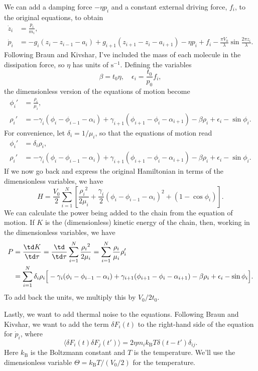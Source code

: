 \documentclass[11pt]{article}
\begin{document}
We can add a damping force $-\eta p_i$ and a constant external driving force, $f_i$, to the original equations, to obtain
\begin{align*}
\dot{z}_i&=\frac{p_i}{m_i},\\
\dot{p}_i&=-g_i(z_i-z_{i-1}-a_i)
	+g_{i+1}(z_{i+1}-z_i-a_{i+1})
	-\eta p_i+f_i
	-\frac{\pi V_0}{\lambda}\sin\frac{2\pi z_i}{\lambda}.
\end{align*}
Following Braun and Kivshar, I've included the mass of each molecule in the dissipation force, so $\eta$ has units of $\text{s}^{-1}$. Defining the variables
\[
\beta=t_0\eta,\quad
\epsilon_i = \frac{t_0}{p_0}f_i,
\]
the dimensionless version of the equations of motion become
\begin{align*}
\phi_i'&=\frac{\rho_i}{\mu_i},\\
\rho_i'&=-\gamma_i(\phi_i-\phi_{i-1}-\alpha_i)
	+\gamma_{i+1}(\phi_{i+1}-\phi_i-\alpha_{i+1})
	-\beta\rho_i+\epsilon_i
	-\sin\phi_i.
\end{align*}
For convenience, let $\delta_i=1/\mu_i$, so that the equations of motion read
\begin{align*}
\phi_i'&=\delta_i\rho_i,\\
\rho_i'&=-\gamma_i(\phi_i-\phi_{i-1}-\alpha_i)
	+\gamma_{i+1}(\phi_{i+1}-\phi_i-\alpha_{i+1})
	-\beta\rho_i+\epsilon_i
	-\sin\phi_i.
\end{align*}
If we now go back and express the original Hamiltonian in terms of the dimensionless variables, we have
\[
H=\frac{V_0}{2}\sum_{i=1}^N
	\left[\frac{{\rho_i}^2}{2\mu_i}
	+\frac{\gamma_i}{2}\left(\phi_i-\phi_{i-1}-\alpha_i\right)^2
	+\left(1-\cos\phi_i\right)\right].
\]
We can calculate the power being added to the chain from the equation of motion. If $K$ is the (dimensionless) kinetic energy of the chain, then, working in the dimensionless variables, we have
\begin{align*}
P&=\frac{\td K}{\td\tau}
	=\frac{\td}{\td\tau}\sum_{i=1}^N\frac{{\rho_i}^2}{2\mu_i}
	=\sum_{i=1}^N \frac{\rho_i}{\mu_i}\rho'_i\\
	&=\sum_{i=1}^N \delta_i\rho_i\Big[
		-\gamma_i(\phi_i-\phi_{i-1}-\alpha_i)
		+\gamma_{i+1}(\phi_{i+1}-\phi_i-\alpha_{i+1})
		-\beta \rho_i+\epsilon_i
		-\sin\phi_i\Big].
\end{align*}
To add back the units, we multiply this by $V_0/2t_0$.

Lastly, we want to add thermal noise to the equations. Following Braun and Kivshar, we want to add the term $\delta F_i(t)$ to the right-hand side of the equation for $\dot{p}_i$, where
\[
\langle\delta F_i(t)\delta F_j(t')\rangle=2\eta m_ik_\text{B}T\delta(t-t')\delta_{ij}.
\]
Here $k_\text{B}$ is the Boltzmann constant and $T$ is the temperature. We'll use the dimensionless variable $\Theta = k_\text{B}T/(V_0/2)$ for the temperature.
\end{document}
